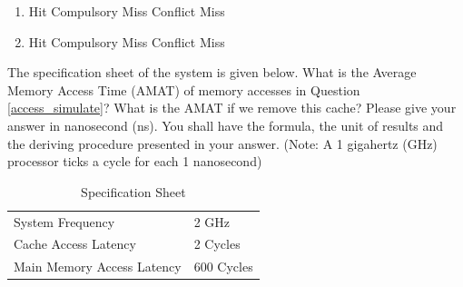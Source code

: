 \begin{questions}
{\begin{solution}
\begin{enumerate}
{\begin{oneparcheckboxes}
                \end{oneparcheckboxes}
            }
            \item 
            {
                \begin{oneparcheckboxes}
                    \choice Hit
                    \CorrectChoice Compulsory Miss
                    \choice Conflict Miss
                \end{oneparcheckboxes}
            }
            \item 
            {
                \begin{oneparcheckboxes}
                    \choice Hit
                    \CorrectChoice Compulsory Miss
                    \CorrectChoice Conflict Miss
                \end{oneparcheckboxes}
            }
        \end{enumerate}
    \end{solution}

}

\newpage

\question[6] 
The specification sheet of the system is given below. What is the
Average Memory Access Time (AMAT) of memory accesses in
Question \ref{access_simulate}?
What is the AMAT if we remove this cache? Please give your answer
in nanosecond (ns). You shall have the formula, the unit of
results and the deriving procedure presented in your answer.
(Note: A 1 gigahertz (GHz) processor ticks a cycle for each 1
nanosecond)

\begin{table}[h]
    \centering
    \begin{tabular}{l l}
        \hline %
        System Frequency           & 2 GHz      \\
        Cache Access Latency       & 2 Cycles   \\
        Main Memory Access Latency & 600 Cycles \\
        \hline %
    \end{tabular}
    \caption{Specification Sheet}
    \label{tab:spec_sheet}
\end{table}


\end{questions}

